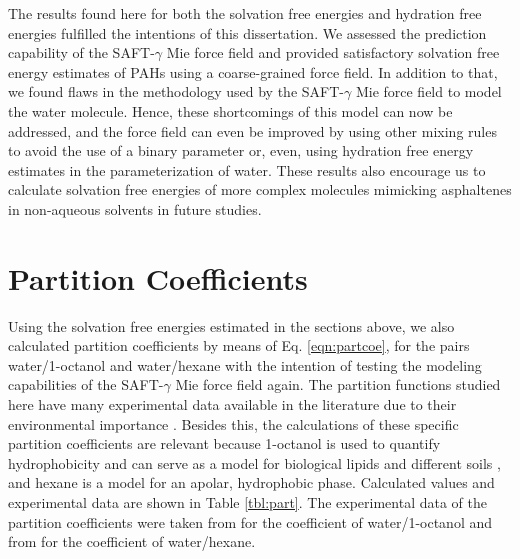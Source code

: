 \documentclass[
	12pt,				%
	openany,			%
	oneside,			%
	a4paper,			%
	english,			%
	brazil				%
	]{abntex2}
\begin{document}
The results found here for both the solvation free energies and hydration free energies fulfilled the intentions of this dissertation. We assessed the prediction capability of the SAFT-$\gamma$ Mie force field and provided satisfactory solvation free energy estimates of PAHs using a coarse-grained force field. In addition to that, we found flaws in the methodology used by the SAFT-$\gamma$ Mie force field to model the water molecule. Hence, these shortcomings of this model can now be addressed, and the force field can even be improved by using other mixing rules to avoid the use of a binary parameter or, even, using hydration free energy estimates in the parameterization of water. These results also encourage us to calculate solvation free energies of more complex molecules mimicking asphaltenes in non-aqueous solvents in future studies.  

\section{Partition Coefficients}

Using the solvation free energies estimated in the sections above, we also calculated partition coefficients by means of Eq. \eqref{eqn:partcoe}, for the pairs  water/1-octanol and water/hexane with the intention of testing the modeling capabilities of the SAFT-$\gamma$ Mie force field again. The partition functions studied here have many experimental data available in the literature due to their environmental importance \cite{sangster}. Besides this, the calculations of these specific partition coefficients are relevant because   1-octanol is used to quantify hydrophobicity and can serve as a model for biological lipids and different soils \cite{RUELLE2000457}, and hexane is a model for an apolar, hydrophobic phase. Calculated values and experimental data are shown in Table \ref{tbl:part}. The experimental data of the partition coefficients were taken from    for the coefficient of water/1-octanol and from  for the coefficient of water/hexane. 
\end{document}
